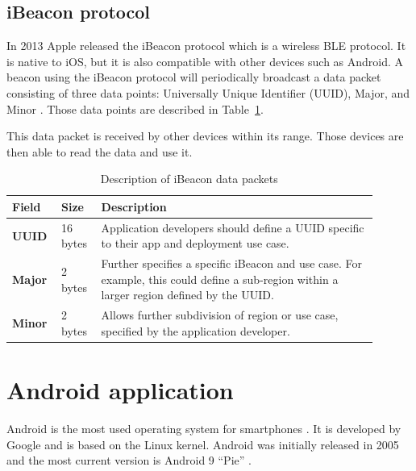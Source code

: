 \documentclass[../Main/thesis.tex]{subfiles}
\begin{document}
\subsection{iBeacon protocol}
In 2013 Apple released the iBeacon protocol which is a wireless BLE protocol.
It is native to iOS, but it is also compatible with other devices such as Android.
A beacon using the iBeacon protocol will periodically broadcast a data packet consisting of three data points: Universally Unique Identifier (UUID), Major, and Minor \citep{Apple2014}.
Those data points are described in Table~\ref{tab:iBeacon-protocol}.

This data packet is received by other devices within its range. 
Those devices are then able to read the data and use it.

\begin{table}[h]
\centering
\caption[Description of iBeacon data packets]{Description of iBeacon data packets\citep[p. 3]{Apple2014}}
\begin{tabular}{|p{0.1\linewidth}|p{0.1\linewidth}|p{0.7\linewidth}|}
\hline
\textbf{Field} & \textbf{Size} & \textbf{Description}                                                                                                                       \\ \hline
\textbf{UUID}  & 16 bytes      & Application developers should define a UUID specific to their app and deployment use case.                                                 \\ \hline
\textbf{Major} & 2 bytes       & Further specifies a specific iBeacon and use case. For example, this could define a sub-region within a larger region defined by the UUID. \\ \hline
\textbf{Minor} & 2 bytes       & Allows further subdivision of region or use case, specified by the application developer.                                                  \\ \hline
\end{tabular}
\label{tab:iBeacon-protocol}
\end{table}

\section{Android application}
Android is the most used operating system for smartphones \citep{osmarketshare}. 
It is developed by Google and is based on the Linux kernel.
Android was initially released in 2005 \citep{Morrill2008a} and the most current version is Android 9 ``Pie'' \cite{Samat2018}.
\end{document}
